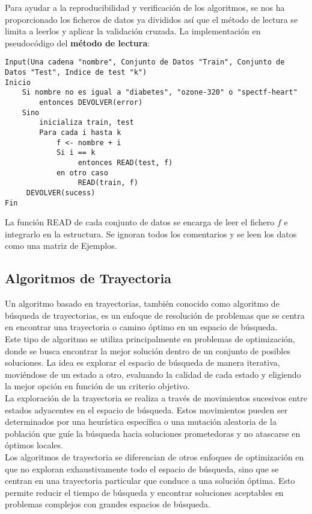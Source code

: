 Para ayudar a la reproducibilidad y verificación de los algoritmos, se nos ha proporcionado los ficheros de datos ya divididos así que el método de lectura se limita a leerlos y aplicar la validación cruzada. La implementación en pseudocódigo del \textbf{método de lectura}:

\begin{verbatim}
Input(Una cadena "nombre", Conjunto de Datos "Train", Conjunto de Datos "Test", Indice de test "k")
Inicio
    Si nombre no es igual a "diabetes", "ozone-320" o "spectf-heart"
        entonces DEVOLVER(error)
    Sino
        inicializa train, test
        Para cada i hasta k
            f <- nombre + i
            Si i == k
                 entonces READ(test, f)
            en otro caso
                 READ(train, f)
     DEVOLVER(sucess)
Fin
\end{verbatim}

La función READ de cada conjunto de datos se encarga de leer el fichero $f$ e integrarlo en la estructura. Se ignoran todos los comentarios y se leen los datos como una matriz de Ejemplos.\\

\subsection{Algoritmos de Trayectoria}
Un algoritmo basado en trayectorias, también conocido como algoritmo de búsqueda de trayectorias, es un enfoque de resolución de problemas que se centra en encontrar una trayectoria o camino óptimo en un espacio de búsqueda.\\

Este tipo de algoritmo se utiliza principalmente en problemas de optimización, donde se busca encontrar la mejor solución dentro de un conjunto de posibles soluciones. La idea es explorar el espacio de búsqueda de manera iterativa, moviéndose de un estado a otro, evaluando la calidad de cada estado y eligiendo la mejor opción en función de un criterio objetivo.\\

La exploración de la trayectoria se realiza a través de movimientos sucesivos entre estados adyacentes en el espacio de búsqueda. Estos movimientos pueden ser determinados por una heurística específica o una mutación aleatoria de la población que guíe la búsqueda hacia soluciones prometedoras y no atascarse en óptimos locales.\\

Los algoritmos de trayectoria se diferencian de otros enfoques de optimización en que no exploran exhaustivamente todo el espacio de búsqueda, sino que se centran en una trayectoria particular que conduce a una solución óptima. Esto permite reducir el tiempo de búsqueda y encontrar soluciones aceptables en problemas complejos con grandes espacios de búsqueda.\\

